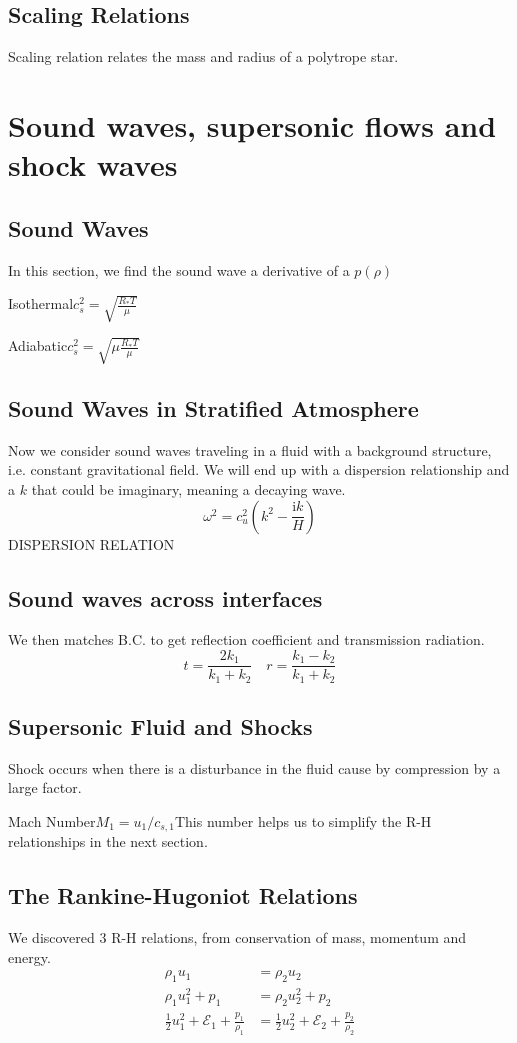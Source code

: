 \documentclass[12pt,a4paper]{article}
\begin{document}
    \subsection{Scaling Relations}
        Scaling relation relates the mass and radius of a polytrope star.
\section{Sound waves, supersonic flows and shock waves}
\subsection{Sound Waves}
    In this section, we find the sound wave a derivative of a $p(\rho)$
    \begin{example}
        {Isothermal}{$c^2_s=\sqrt{\frac{R_{*}T}{\mu}}$}
    \end{example}
    \begin{example}
        {Adiabatic}{$c^2_s=\sqrt{\mu\frac{R_{*}T}{\mu}}$}
    \end{example}
\subsection{Sound Waves in Stratified Atmosphere}
    Now we consider sound waves traveling in a fluid with a background structure, i.e. constant gravitational field.
    We will end up with a dispersion relationship and a $k$ that could be imaginary, meaning a decaying wave.
    $$
    \omega^2=c_u^2\left(k^2-\frac{\mathrm{i} k}{H}\right)
    $$
    DISPERSION RELATION
\subsection{Sound waves across interfaces}
    We then matches B.C. to get reflection coefficient and transmission radiation.
    $$
    t=\frac{2 k_1}{k_1+k_2} \quad r=\frac{k_1-k_2}{k_1+k_2}
    $$
\subsection{Supersonic Fluid and Shocks}
    Shock occurs when there is a disturbance in the fluid cause by compression by a large factor.\\
    \begin{definition}
        {Mach Number}{$M_1= u_1/c_{s,1}$}{This number helps us to simplify the R-H relationships in the next section.}
    \end{definition}
\subsection{The Rankine-Hugoniot Relations}
    We discovered 3 R-H relations, from conservation of mass, momentum and energy.
    \begin{align*}
        \rho_1 u_1&=\rho_2 u_2\\
        \rho_1 u_1^2+p_1&=\rho_2 u_2^2+p_2\\
        \frac{1}{2} u_1^2+\mathcal{E}_1+\frac{p_1}{\rho_1}&=\frac{1}{2} u_2^2+\mathcal{E}_2+\frac{p_2}{\rho_2}
    \end{align*}
\end{document}
